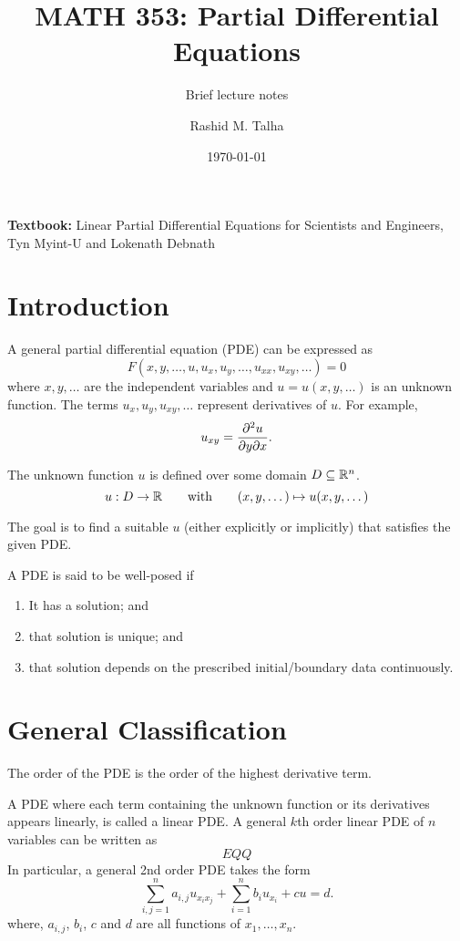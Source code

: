 \documentclass[11pt]{penrose}
\title{MATH 353: Partial Differential Equations}
\subtitle{Brief lecture notes}
\author{Rashid M. Talha}
\affiliation{School of Natural Sciences, NUST}
\date{\today}
\begin{document}
\maketitle

\textbf{Textbook:} Linear Partial Differential Equations for Scientists and Engineers, Tyn Myint-U and Lokenath Debnath

\section{Introduction}
A general partial differential equation (PDE) can be expressed as
\begin{equation}
    F(x,y,\dots, u, u_x, u_y, \dots, u_{xx}, u_{xy}, \dots) = 0
\end{equation}
where $x, y, \dots$ are the independent variables and $u = u(x,y,\dots)$ is an unknown function. The terms $u_x, u_y, u_{xy}, \dots$ represent derivatives of $u$. For example,
\begin{equation*}
    u_{xy} = \frac{\partial^2 u}{\partial y \partial x}.
\end{equation*}

The unknown function $u$ is defined over some domain $D \subseteq \mathbb{R}^{n}$.
\begin{equation}
    u : D \to \mathbb{R}
    \qquad\text{with}\qquad
    (x, y, \dots) \mapsto u(x, y, \dots)
\end{equation}

The goal is to find a suitable $u$ (either explicitly or implicitly) that satisfies the given PDE.

\begin{ndfn}
    A PDE is said to be well-posed if
    \begin{enumerate}
        \item It has a solution; and
        \item that solution is unique; and
        \item that solution depends on the prescribed initial/boundary data continuously.
    \end{enumerate}
\end{ndfn}

\section{General Classification}

The order of the PDE is the order of the highest derivative term.

A PDE where each term containing the unknown function or its derivatives appears linearly, is called a linear PDE. A general $k$th order linear PDE of $n$ variables can be written as
\begin{equation*}
    EQQ
\end{equation*}
In particular, a general 2nd order PDE takes the form
\begin{equation*}
    \sum_{i,j=1}^{n} a_{i,j} u_{x_i x_j} + \sum_{i=1}^{n} b_i u_{x_i} + c u = d.
\end{equation*}
where, $a_{i,j}$, $b_{i}$, $c$ and $d$ are all functions of $x_1, \dots, x_n$.
\end{document}
